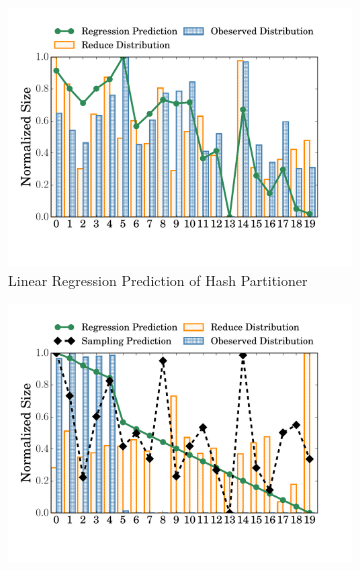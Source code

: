 

\begin{figure}
	\centering
	\begin{subfigure}[b]{0.32\linewidth}
		\includegraphics[width=\linewidth]{fig/hash_pre}
		\caption{Linear Regression Prediction of Hash Partitioner}
		\label{fig:hash_pre}
	\end{subfigure}
	\begin{subfigure}[b]{0.32\linewidth}
		\includegraphics[width=\linewidth]{fig/range_pre_sample}

\end{subfigure}
\end{figure}
